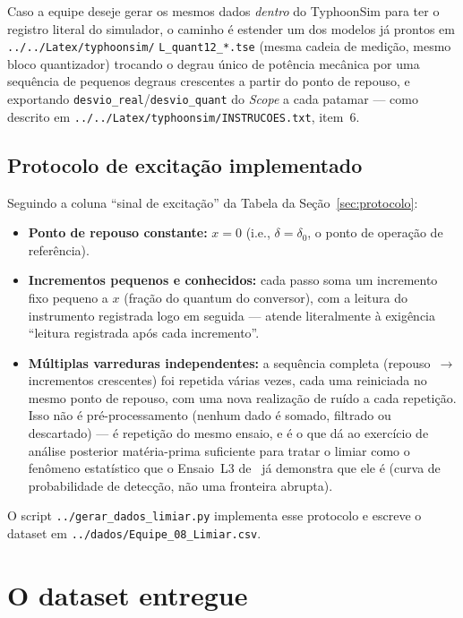 Caso a equipe deseje gerar os mesmos dados \emph{dentro} do TyphoonSim para ter o registro
literal do simulador, o caminho é estender um dos modelos já prontos em
\texttt{../../Latex/typhoonsim/} \texttt{L\_quant12\_*.tse} (mesma cadeia de medição, mesmo bloco
quantizador) trocando o degrau único de potência mecânica por uma sequência de pequenos degraus
crescentes a partir do ponto de repouso, e exportando \texttt{desvio\_real}/\texttt{desvio\_quant}
do \emph{Scope} a cada patamar --- como descrito
em \texttt{../../Latex/typhoonsim/INSTRUCOES.txt}, item~6.

\subsection*{Protocolo de excitação implementado}

Seguindo a coluna ``sinal de excitação'' da Tabela da Seção~\ref{sec:protocolo}:

\begin{itemize}[leftmargin=1.4em]
\item \textbf{Ponto de repouso constante:} $x=0$ (i.e., $\delta=\delta_0$, o ponto de operação de
      referência).
\item \textbf{Incrementos pequenos e conhecidos:} cada passo soma um incremento fixo pequeno a
      $x$ (fração do quantum do conversor), com a leitura do instrumento registrada logo em
      seguida --- atende literalmente à exigência ``leitura registrada após cada incremento''.
\item \textbf{Múltiplas varreduras independentes:} a sequência completa (repouso~$\to$
      incrementos crescentes) foi repetida várias vezes, cada uma reiniciada no mesmo ponto de
      repouso, com uma nova realização de ruído a cada repetição. Isso não é pré-processamento
      (nenhum dado é somado, filtrado ou descartado) --- é repetição do mesmo ensaio, e é o que
      dá ao exercício de análise posterior matéria-prima suficiente para tratar o limiar como o
      fenômeno estatístico que o Ensaio~L3 de~\cite{limiarv1} já demonstra que ele é (curva de
      probabilidade de detecção, não uma fronteira abrupta).
\end{itemize}

O script \texttt{../gerar\_dados\_limiar.py} implementa esse protocolo e escreve o dataset em
\texttt{../dados/Equipe\_08\_Limiar.csv}.

\section{O dataset entregue}
\label{sec:dataset}

